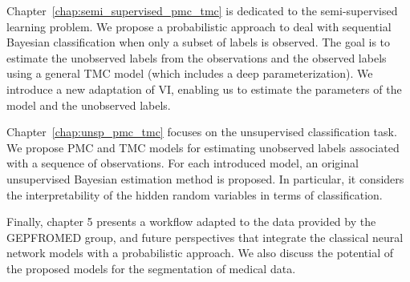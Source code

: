 Chapter~\ref{chap:semi_supervised_pmc_tmc}
is dedicated to the semi-supervised learning problem. We propose a probabilistic
approach to deal with sequential Bayesian classification when only a subset of
labels is observed. The goal is to estimate the unobserved labels from the
observations and the observed labels using a general TMC model 
(which includes a deep parameterization). We introduce a
new adaptation of VI, enabling us to estimate the parameters of the
model and the unobserved labels.


Chapter~\ref{chap:unsp_pmc_tmc}
focuses on the unsupervised classification task. We propose PMC and TMC models
for estimating unobserved labels associated with a sequence
of observations. For each introduced model, an original unsupervised Bayesian
estimation method is proposed. In particular, it considers the interpretability
of the hidden random variables in terms of classification.


Finally, chapter 5
presents a workflow adapted to the data provided by
the GEPFROMED group, and future perspectives that integrate the classical
neural network models with a probabilistic approach. We also discuss the
potential of the proposed models for the segmentation of medical data.



